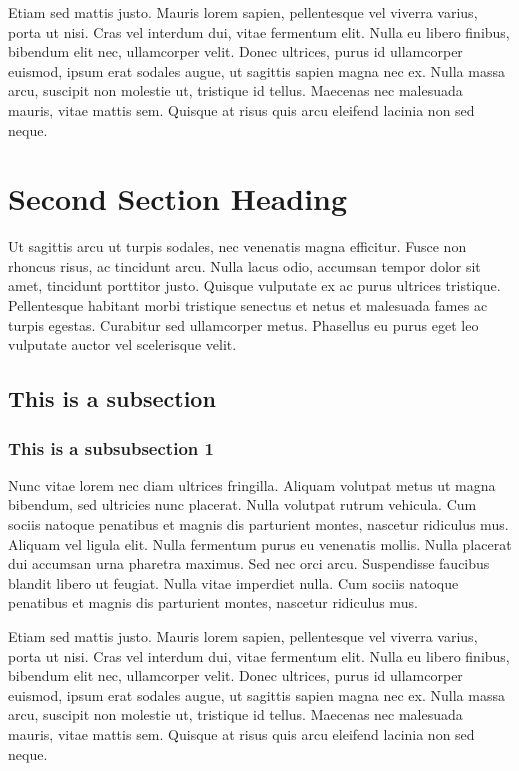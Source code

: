 \documentclass{acmsiggraph}
\begin{document}
Etiam sed mattis justo. Mauris lorem sapien, pellentesque vel viverra varius, porta ut nisi. Cras vel interdum dui, vitae fermentum elit. Nulla eu libero finibus, bibendum elit nec, ullamcorper velit. Donec ultrices, purus id ullamcorper euismod, ipsum erat sodales augue, ut sagittis sapien magna nec ex. Nulla massa arcu, suscipit non molestie ut, tristique id tellus. Maecenas nec malesuada mauris, vitae mattis sem. Quisque at risus quis arcu eleifend lacinia non sed neque.

\section{Second Section Heading}

Ut sagittis arcu ut turpis sodales, nec venenatis magna efficitur. Fusce non rhoncus risus, ac tincidunt arcu. Nulla lacus odio, accumsan tempor dolor sit amet, tincidunt porttitor justo. Quisque vulputate ex ac purus ultrices tristique. Pellentesque habitant morbi tristique senectus et netus et malesuada fames ac turpis egestas. Curabitur sed ullamcorper metus. Phasellus eu purus eget leo vulputate auctor vel scelerisque velit.

\subsection{This is a subsection}

\subsubsection{This is a subsubsection 1}
Nunc vitae lorem nec diam ultrices fringilla. Aliquam volutpat metus ut magna bibendum, sed ultricies nunc placerat. Nulla volutpat rutrum vehicula. Cum sociis natoque penatibus et magnis dis parturient montes, nascetur ridiculus mus. Aliquam vel ligula elit. Nulla fermentum purus eu venenatis mollis. Nulla placerat dui accumsan urna pharetra maximus. Sed nec orci arcu. Suspendisse faucibus blandit libero ut feugiat. Nulla vitae imperdiet nulla. Cum sociis natoque penatibus et magnis dis parturient montes, nascetur ridiculus mus.

Etiam sed mattis justo. Mauris lorem sapien, pellentesque vel viverra varius, porta ut nisi. Cras vel interdum dui, vitae fermentum elit. Nulla eu libero finibus, bibendum elit nec, ullamcorper velit. Donec ultrices, purus id ullamcorper euismod, ipsum erat sodales augue, ut sagittis sapien magna nec ex. Nulla massa arcu, suscipit non molestie ut, tristique id tellus. Maecenas nec malesuada mauris, vitae mattis sem. Quisque at risus quis arcu eleifend lacinia non sed neque.
\end{document}
